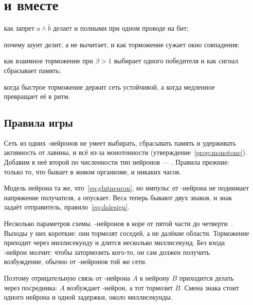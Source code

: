 \chapter{ и  вместе}
\label{sec:gaba}
\begin{chaptergoals}
\item как запрет $a\wedge\bar b$ делает  и  полными при одном проводе на бит;
\item почему шунт делит, а не вычитает, и как торможение сужает окно совпадения;
\item как взаимное торможение при $\beta>1$ выбирает одного победителя и как сигнал сбрасывает память;
\item когда быстрое торможение держит сеть устойчивой, а когда медленное превращает её в ритм.
\end{chaptergoals}

\section{Правила игры}

Сеть из одних -нейронов не умеет выбирать, сбрасывать память и удерживать активность от лавины, и всё из-за монотонности (утверждение~\ref{prop:monotone}). Добавим в неё второй по численности тип нейронов --- . Правила прежние: только то, что бывает в живом организме, и никаких часов.

Модель нейрона та же, что~\eqref{eq:glutneuron}, но импульс от -нейрона не поднимает напряжение получателя, а опускает. Веса теперь бывают двух знаков, и знак задаёт отправитель, правило~\eqref{eq:dalesign}.

Несколько параметров схемы. -нейронов в коре от пятой части до четверти~\cite{Hendry1987}. Выходы у них короткие: они тормозят соседей, а не далёкие области. Торможение приходит через миллисекунду и длится несколько миллисекунд. Без входа -нейрон молчит: чтобы затормозить кого-то, он сам должен получить возбуждение, обычно от -нейронов той же сети.

Поэтому отрицательную связь от -нейрона $A$ к нейрону $B$ приходится делать через посредника: $A$ возбуждает -нейрон, а тот тормозит $B$. Смена знака стоит одного нейрона и одной задержки, около миллисекунды.

